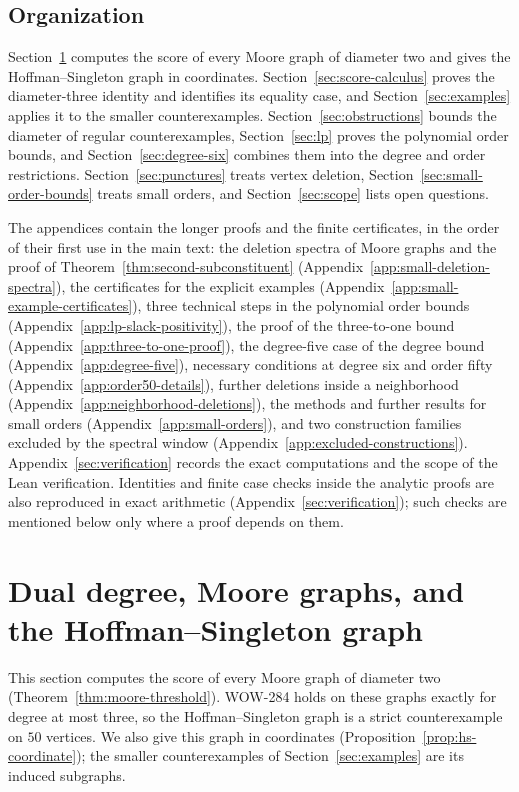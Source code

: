 \documentclass[a4paper,10pt,reqno]{amsart}
\theoremstyle{plain}
\theoremstyle{definition}
\theoremstyle{remark}
\begin{document}
\subsection{Organization}

Section~\ref{sec:moore} computes the score of every Moore graph of
diameter two and gives the Hoffman--Singleton graph in coordinates.
Section~\ref{sec:score-calculus} proves the diameter-three identity and
identifies its equality case, and Section~\ref{sec:examples} applies it to
the smaller counterexamples. Section~\ref{sec:obstructions} bounds
the diameter of regular counterexamples, Section~\ref{sec:lp} proves the
polynomial order bounds, and Section~\ref{sec:degree-six} combines them into
the degree and order restrictions. Section~\ref{sec:punctures} treats vertex
deletion, Section~\ref{sec:small-order-bounds} treats small orders, and
Section~\ref{sec:scope} lists open questions.

The appendices contain the longer proofs and the finite certificates, in the
order of their first use in the main text: the deletion spectra of Moore
graphs and the proof of Theorem~\ref{thm:second-subconstituent}
(Appendix~\ref{app:small-deletion-spectra}), the certificates for the
explicit examples (Appendix~\ref{app:small-example-certificates}), three
technical steps in the polynomial order bounds
(Appendix~\ref{app:lp-slack-positivity}), the proof of the three-to-one
bound (Appendix~\ref{app:three-to-one-proof}), the degree-five case of the
degree bound (Appendix~\ref{app:degree-five}), necessary conditions at
degree six and order fifty (Appendix~\ref{app:order50-details}), further
deletions inside a neighborhood (Appendix~\ref{app:neighborhood-deletions}),
the methods and further results for small orders
(Appendix~\ref{app:small-orders}), and two construction families excluded by
the spectral window (Appendix~\ref{app:excluded-constructions}).
Appendix~\ref{sec:verification} records the exact computations and the
scope of the Lean verification.
Identities and finite case checks inside the analytic proofs are also
reproduced in exact arithmetic (Appendix~\ref{sec:verification}); such checks
are mentioned below only where a proof depends on them.

\section{Dual degree, Moore graphs, and the Hoffman--Singleton graph}
\label{sec:moore}

This section computes the score of every Moore graph of diameter two
(Theorem~\ref{thm:moore-threshold}). WOW-284 holds on these graphs exactly
for degree at most three, so the Hoffman--Singleton graph is a strict
counterexample on \(50\) vertices. We also give this graph in coordinates
(Proposition~\ref{prop:hs-coordinate}); the smaller counterexamples of
Section~\ref{sec:examples} are its induced subgraphs.
\end{document}

